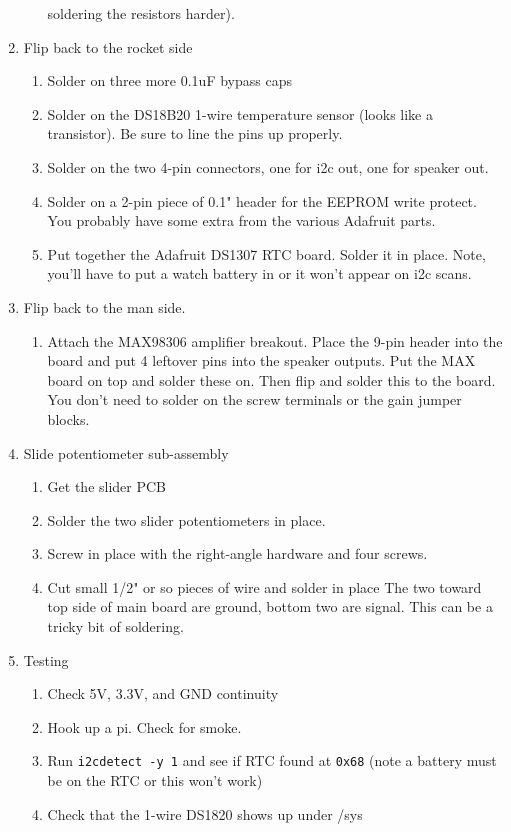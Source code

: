 \documentclass[11pt]{article}
\begin{document}
\begin{enumerate}
\begin{enumerate}
				soldering the resistors harder).
	\end{enumerate}
\item	Flip back to the rocket side
	\begin{enumerate}
		\item Solder on three more 0.1uF bypass caps
		\item Solder on the DS18B20 1-wire temperature sensor (looks like
			a transistor).
                      Be sure to line the pins up properly.
		\item Solder on the two 4-pin connectors, one for i2c out, one for
			speaker out.
		\item Solder on a 2-pin piece of 0.1" header for the EEPROM write
			protect.
			You probably have some extra from the various Adafruit parts.
		\item Put together the Adafruit DS1307 RTC board.  Solder it in place.
			Note, you'll have to put a watch battery in or it won't appear
			on i2c scans.
	\end{enumerate}
\item Flip back to the man side.
	\begin{enumerate}
		\item Attach the MAX98306 amplifier breakout.
			Place the 9-pin header into the board and put 4 leftover pins
			into the speaker outputs.  Put the MAX board on top and solder these on.
			Then flip and solder this to the board.  You don't need to solder on
			the screw terminals or the gain jumper blocks.
	\end{enumerate}
	
\item Slide potentiometer sub-assembly
	\begin{enumerate}
		\item Get the slider PCB
		\item Solder the two slider potentiometers in place.
		\item Screw in place with the right-angle hardware and four screws.
		\item Cut small 1/2" or so pieces of wire and solder in place
			The two toward top side of main board are ground, 
			bottom two are signal.
			This can be a tricky bit of soldering.
	\end{enumerate}

\item Testing
	\begin{enumerate}
		\item Check 5V, 3.3V, and GND continuity
		\item Hook up a pi.  Check for smoke.
		\item Run {\tt i2cdetect -y 1} and see if RTC found at {\tt 0x68}
			(note a battery must be on the RTC or this won't work)
		\item Check that the 1-wire DS1820 shows up under /sys
	\end{enumerate}
			

\end{enumerate}
\end{document}
